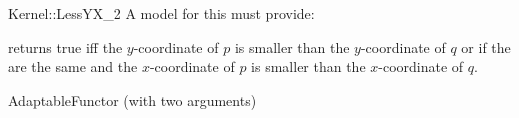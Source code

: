 \begin{ccRefFunctionObjectConcept}{Kernel::LessYX_2}
A model for this must provide:


{returns true iff the $y$-coordinate of $p$ is smaller than the
$y$-coordinate of $q$ or if the are the same and 
the $x$-coordinate of $p$ is smaller than the $x$-coordinate of $q$.}

\ccRefines
AdaptableFunctor (with two arguments)

\ccSeeAlso
{}\\

\end{ccRefFunctionObjectConcept}
